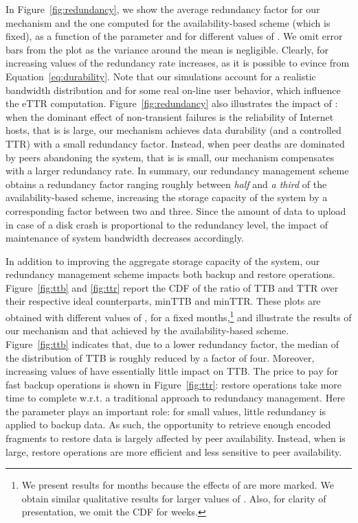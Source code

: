 In Figure~\ref{fig:redundancy}, we show the average redundancy factor
for our mechanism and the one computed for the availability-based
scheme (which is fixed), as a function of the parameter  and for
different values of . We omit error bars from the plot as the
variance around the mean is negligible. Clearly, for increasing values
of  the redundancy rate increases, as it is possible to evince from
Equation~\ref{eq:durability}. Note that our simulations account for a
realistic bandwidth distribution and for some real on-line user
behavior, which influence the eTTR
computation. Figure~\ref{fig:redundancy} also illustrates the impact of
: when the dominant effect of non-transient failures is the
reliability of Internet hosts, that is  is large, our mechanism
achieves data durability (and a controlled TTR) with a small
redundancy factor. Instead, when peer deaths are dominated by peers
abandoning the system, that is  is small, our mechanism
compensates with a larger redundancy rate. In summary, our redundancy
management scheme obtains a redundancy factor ranging roughly between
\emph{half} and \emph{a third} of the availability-based scheme,
increasing the storage capacity of the system by a corresponding
factor between two and three. Since the amount of data to upload in
case of a disk crash is proportional to the redundancy level, the
impact of maintenance of system bandwidth decreases accordingly.

In addition to improving the aggregate storage capacity of the system,
our redundancy management scheme impacts both backup and restore
operations. Figure~\ref{fig:ttb} and \ref{fig:ttr} report the CDF of the
ratio of TTB and TTR over their respective ideal counterparts,
minTTB and minTTR. These plots are obtained with different values
of , for a fixed  months,\footnote{We present results for
 months because the effects of  are more marked. We obtain
similar qualitative results for larger values of . Also, for
clarity of presentation, we omit the CDF for  weeks.} and
illustrate the results of our mechanism and that achieved by the
availability-based scheme. Figure~\ref{fig:ttb} indicates that, due to a
lower redundancy factor, the median of the distribution of TTB is
roughly reduced by a factor of four. Moreover, increasing values of
 have essentially little impact on TTB. The price to pay for fast
backup operations is shown in Figure~\ref{fig:ttr}: restore operations
take more time to complete w.r.t. a traditional approach to redundancy
management. Here the parameter  plays an important role: for small
 values, little redundancy is applied to backup data. As such, the
opportunity to retrieve enough encoded fragments to restore data is
largely affected by peer availability. Instead, when  is large,
restore operations are more efficient and less sensitive to peer
availability.

